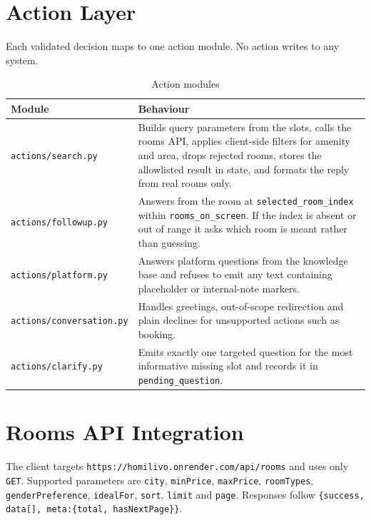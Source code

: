 \documentclass[11pt,a4paper]{article}
\newcommand{\fn}[1]{\texttt{\small #1}}
\begin{document}
\section{Action Layer}

Each validated decision maps to one action module. No action writes to any system.

\begin{table}[H]
\centering
\caption{Action modules}
\small
\begin{tabularx}{\textwidth}{@{}l>{\raggedright\arraybackslash}X@{}}
\toprule
\textbf{Module} & \textbf{Behaviour}\\
\midrule
\fn{actions/search.py} &
Builds query parameters from the slots, calls the rooms API, applies client-side filters for
amenity and area, drops rejected rooms, stores the allowlisted result in state, and formats
the reply from real rooms only.\\
\addlinespace
\fn{actions/followup.py} &
Answers from the room at \fn{selected\_room\_index} within \fn{rooms\_on\_screen}. If the
index is absent or out of range it asks which room is meant rather than guessing.\\
\addlinespace
\fn{actions/platform.py} &
Answers platform questions from the knowledge base and refuses to emit any text containing
placeholder or internal-note markers.\\
\addlinespace
\fn{actions/conversation.py} &
Handles greetings, out-of-scope redirection and plain declines for unsupported actions such
as booking.\\
\addlinespace
\fn{actions/clarify.py} &
Emits exactly one targeted question for the most informative missing slot and records it in
\fn{pending\_question}.\\
\bottomrule
\end{tabularx}
\end{table}

\section{Rooms API Integration}

The client targets \fn{https://homilivo.onrender.com/api/rooms} and uses only \fn{GET}.
Supported parameters are \fn{city}, \fn{minPrice}, \fn{maxPrice}, \fn{roomTypes},
\fn{genderPreference}, \fn{idealFor}, \fn{sort}, \fn{limit} and \fn{page}. Responses follow
\fn{\{success, data[], meta:\{total, hasNextPage\}\}}.
\end{document}
